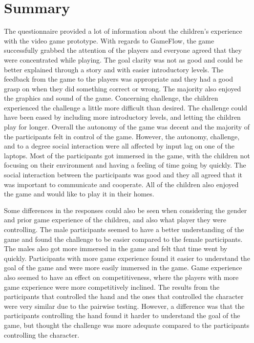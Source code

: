 \section{Summary}
The questionnaire provided a lot of information about the children's experience with the video game prototype.
With regards to GameFlow, the game successfully grabbed the attention of the players and everyone agreed that they were concentrated while playing. The goal clarity was not as good and could be better explained through a story and with easier introductory levels. The feedback from the game to the players was appropriate and they had a good grasp on when they did something correct or wrong. The majority also enjoyed the graphics and sound of the game. Concerning challenge, the children experienced the challenge a little more difficult than desired. The challenge could have been eased by including more introductory levels, and letting the children play for longer. Overall the autonomy of the game was decent and the majority of the participants felt in control of the game. However, the autonomy, challenge, and to a degree social interaction were all affected by input lag on one of the laptops. Most of the participants got immersed in the game, with the children not focusing on their environment and having a feeling of time going by quickly. The social interaction between the participants was good and they all agreed that it was important to communicate and cooperate. All of the children also enjoyed the game and would like to play it in their homes.

Some differences in the responses could also be seen when considering the gender and prior game experience of the children, and also what player they were controlling. The male participants seemed to have a better understanding of the game and found the challenge to be easier compared to the female participants. The males also got more immersed in the game and felt that time went by quickly. Participants with more game experience found it easier to understand the goal of the game and were more easily immersed in the game. Game experience also seemed to have an effect on competitiveness, where the players with more game experience were more competitively inclined. The results from the participants that controlled the hand and the ones that controlled the character were very similar due to the pairwise testing. However, a difference was that the participants controlling the hand found it harder to understand the goal of the game, but thought the challenge was more adequate compared to the participants controlling the character.
